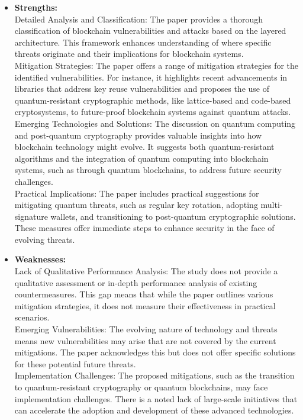 \documentclass[12pt,a4paper]{article}
\begin{document}
\begin{itemize}
    \begin{itemize}
        \item \textbf{Strengths:} 
        \\ 
Detailed Analysis and Classification: The paper provides a thorough classification of blockchain vulnerabilities and attacks based on the layered architecture. This framework enhances understanding of where specific threats originate and their implications for blockchain systems.
\\
Mitigation Strategies: The paper offers a range of mitigation strategies for the identified vulnerabilities. For instance, it highlights recent advancements in libraries that address key reuse vulnerabilities and proposes the use of quantum-resistant cryptographic methods, like lattice-based and code-based cryptosystems, to future-proof blockchain systems against quantum attacks.
\\
Emerging Technologies and Solutions: The discussion on quantum computing and post-quantum cryptography provides valuable insights into how blockchain technology might evolve. It suggests both quantum-resistant algorithms and the integration of quantum computing into blockchain systems, such as through quantum blockchains, to address future security challenges.
\\
Practical Implications: The paper includes practical suggestions for mitigating quantum threats, such as regular key rotation, adopting multi-signature wallets, and transitioning to post-quantum cryptographic solutions. These measures offer immediate steps to enhance security in the face of evolving threats.
        \item \textbf{Weaknesses:} \\
Lack of Qualitative Performance Analysis: The study does not provide a qualitative assessment or in-depth performance analysis of existing countermeasures. This gap means that while the paper outlines various mitigation strategies, it does not measure their effectiveness in practical scenarios.
\\
Emerging Vulnerabilities: The evolving nature of technology and threats means new vulnerabilities may arise that are not covered by the current mitigations. The paper acknowledges this but does not offer specific solutions for these potential future threats.
\\
Implementation Challenges: The proposed mitigations, such as the transition to quantum-resistant cryptography or quantum blockchains, may face implementation challenges. There is a noted lack of large-scale initiatives that can accelerate the adoption and development of these advanced technologies.

\end{itemize}
\end{itemize}
\end{document}
